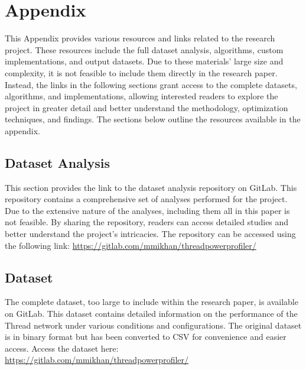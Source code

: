 \chapter*{Appendix}\label{appendix}




\appendix
This Appendix provides various resources and links related to the research project. These resources include the full dataset analysis, algorithms, custom implementations, and output datasets. Due to these materials' large size and complexity, it is not feasible to include them directly in the research paper. Instead, the links in the following sections grant access to the complete datasets, algorithms, and implementations, allowing interested readers to explore the project in greater detail and better understand the methodology, optimization techniques, and findings. The sections below outline the resources available in the appendix.

\section{Dataset Analysis}
This section provides the link to the dataset analysis repository on GitLab. This repository contains a comprehensive set of analyses performed for the project. Due to the extensive nature of the analyses, including them all in this paper is not feasible. By sharing the repository, readers can access detailed studies and better understand the project's intricacies. The repository can be accessed using the following link: \url{https://gitlab.com/mmikhan/threadpowerprofiler/}

\section{Dataset}
The complete dataset, too large to include within the research paper, is available on GitLab. This dataset contains detailed information on the performance of the Thread network under various conditions and configurations. The original dataset is in binary format but has been converted to CSV for convenience and easier access. Access the dataset here: \url{https://gitlab.com/mmikhan/threadpowerprofiler/}

